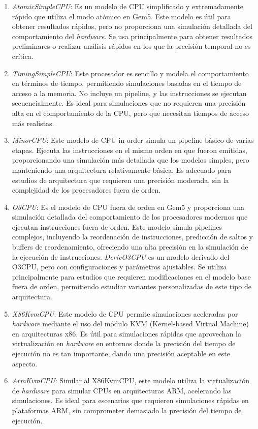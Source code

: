 \begin{enumerate}
    \item \textit{AtomicSimpleCPU}: Es un modelo de CPU simplificado y extremadamente rápido que utiliza el modo atómico en Gem5. Este modelo es útil para obtener resultados rápidos, pero no proporciona una simulación detallada del comportamiento del \textit{hardware}. Se usa principalmente para obtener resultados preliminares o realizar análisis rápidos en los que la precisión temporal no es crítica.

    \item \textit{TimingSimpleCPU}: Este procesador es sencillo y modela el comportamiento en términos de tiempo, permitiendo simulaciones basadas en el tiempo de acceso a la memoria. No incluye un pipeline, y las instrucciones se ejecutan secuencialmente. Es ideal para simulaciones que no requieren una precisión alta en el comportamiento de la CPU, pero que necesitan tiempos de acceso más realistas.

    \item \textit{MinorCPU}: Este modelo de CPU in-order simula un pipeline básico de varias etapas. Ejecuta las instrucciones en el mismo orden en que fueron emitidas, proporcionando una simulación más detallada que los modelos simples, pero manteniendo una arquitectura relativamente básica. Es adecuado para estudios de arquitectura que requieren una precisión moderada, sin la complejidad de los procesadores fuera de orden.

    \item \textit{\ac{O3}CPU}: Es el modelo de CPU fuera de orden en Gem5 y proporciona una simulación detallada del comportamiento de los procesadores modernos que ejecutan instrucciones fuera de orden. Este modelo simula pipelines complejos, incluyendo la reordenación de instrucciones, predicción de saltos y buffers de reordenamiento, ofreciendo una alta precisión en la simulación de la ejecución de instrucciones. \emph{Deriv\ac{O3}CPU} es un modelo derivado del \ac{O3}CPU, pero con configuraciones y parámetros ajustables. Se utiliza principalmente para estudios que requieren modificaciones en el modelo base fuera de orden, permitiendo estudiar variantes personalizadas de este tipo de arquitectura.

    \item \textit{X86KvmCPU}: Este modelo de CPU permite simulaciones aceleradas por \textit{hardware} mediante el uso del módulo KVM (Kernel-based Virtual Machine) en arquitecturas x86. Es útil para simulaciones rápidas que aprovechan la virtualización en \textit{hardware} en entornos donde la precisión del tiempo de ejecución no es tan importante, dando una precisión aceptable en este aspecto.

    \item \textit{ArmKvmCPU}: Similar al X86KvmCPU, este modelo utiliza la virtualización de \textit{hardware} para simular CPUs en arquitecturas \ac{ARM}, acelerando las simulaciones. Es ideal para escenarios que requieren simulaciones rápidas en plataformas \ac{ARM}, sin comprometer demasiado la precisión del tiempo de ejecución.
\end{enumerate}

